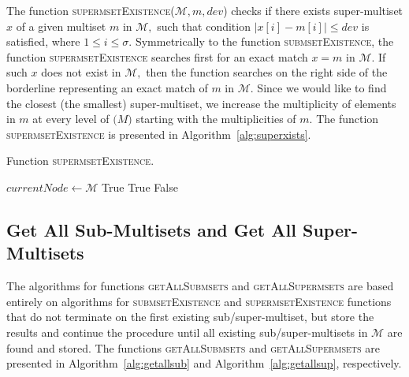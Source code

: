 \documentclass[algorithms,article,accept,pdftex,moreauthors]{Definitions/mdpi}
\begin{document}
The function \textsc{supermsetExistence}($\mathcal{M},m,dev$) checks if there 
exists super-multiset $x$ of a given multiset $m$ in $\mathcal{M},$ such that 
condition $| x[i] - m[i] |\leq dev$ is satisfied, where \mbox{$1\leq i \leq \sigma.$}
Symmetrically to the function \textsc{submsetExistence}, the function
\textsc{supermsetExistence} searches first for an exact match $x=m$ in
$\mathcal{M}.$ If such $x$ does not exist in $\mathcal{M},$ then
the function searches on the right side of the borderline representing
an exact match of $m$ in $\mathcal{M}.$ Since we would like to find
the closest (the smallest) super-multiset, we increase the multiplicity of
elements in $m$ at every level of $\mathcal(M)$ starting with
the multiplicities of $m.$ The function \textsc{supermsetExistence}
is presented in Algorithm~\ref{alg:superxists}.


\begin{algorithm}[H]
\caption{Function \textsc{supermsetExistence}.}
\label{alg:superxists}
\begin{algorithmic}[1]
\State $currentNode \gets \mathcal{M}$
\State \Return True
\EndIf
{}
\State \Return True
\EndIf
\EndIf
\EndFor
\State \Return False
\EndFunction
\end{algorithmic}
\end{algorithm}


\subsection{Get All Sub-Multisets and Get All Super-Multisets} \label{s:getall}
The algorithms for functions \textsc{getAllSubmsets} and 
\textsc{getAllSupermsets} are based entirely on algorithms for 
\textsc{submsetExistence} and \textsc{supermsetExistence} functions that do not 
terminate on the first existing sub/super-multiset, but store the results and 
continue the procedure until all existing sub/super-multisets in $\mathcal{M}$ are 
found and stored. The functions \textsc{getAllSubmsets} and \textsc{getAllSupermsets} 
are presented in Algorithm~\ref{alg:getallsub} and Algorithm~\ref{alg:getallsup}, respectively.
\end{document}
